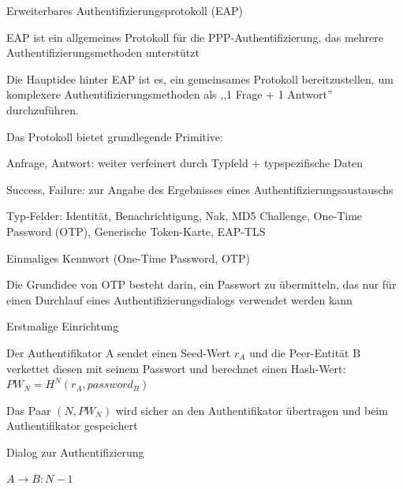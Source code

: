 \documentclass[a4paper]{article}
\begin{document}
\begin{multicols}{3}
\begin{itemize*}
            \item Erweiterbares Authentifizierungsprotokoll (EAP)
            \begin{itemize*}
                  \item EAP ist ein allgemeines Protokoll für die PPP-Authentifizierung, das mehrere Authentifizierungsmethoden unterstützt
                  \item Die Hauptidee hinter EAP ist es, ein gemeinsames Protokoll bereitzustellen, um komplexere Authentifizierungsmethoden als ,,1 Frage + 1 Antwort'' durchzuführen.
                  \item Das Protokoll bietet grundlegende Primitive:
                  \begin{itemize*}
                        \item Anfrage, Antwort: weiter verfeinert durch Typfeld + typspezifische Daten
                        \item Success, Failure: zur Angabe des Ergebnisses eines Authentifizierungsaustauschs
                  \end{itemize*}
                  \item Typ-Felder: Identität, Benachrichtigung, Nak, MD5 Challenge, One-Time Password (OTP), Generische Token-Karte, EAP-TLS
            \end{itemize*}
            \item Einmaliges Kennwort (One-Time Password, OTP)
            \begin{itemize*}
                  \item Die Grundidee von OTP besteht darin, ein Passwort zu übermitteln, das nur für einen Durchlauf eines Authentifizierungsdialogs verwendet werden kann
                  \item Erstmalige Einrichtung
                  \begin{itemize*}
                        \item Der Authentifikator A sendet einen Seed-Wert $r_A$ und die Peer-Entität B verkettet diesen mit seinem Passwort und berechnet einen Hash-Wert: $PW_N = H^N(r_A, password_B)$
                        \item Das Paar $(N, PW_N)$ wird sicher an den Authentifikator übertragen und beim Authentifikator gespeichert
                  \end{itemize*}
                  \item Dialog zur Authentifizierung
                  \begin{itemize*}
                        \item $A\rightarrow B: N - 1$

\end{itemize*}
\end{itemize*}
\end{itemize*}
\end{multicols}
\end{document}
